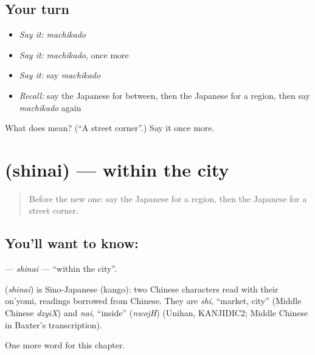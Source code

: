 \subsection*{Your turn}
\begin{itemize}
\raggedright
  \item \emph{Say it:} \emph{machikado}
  \item \emph{Say it:} \emph{machikado}, once more
  \item \emph{Say it:} say \emph{machikado}
  \item \emph{Recall:} say the Japanese for between, then the Japanese for a region, then say \emph{machikado} again
\end{itemize}

\begin{tcolorbox}[breakable,colback=teal!4,colframe=teal!35!black,title={Before you move on}]
What does  mean? (\textquotedblleft{}A street corner\textquotedblright{}.) Say it once more.
\end{tcolorbox}
\section[\texorpdfstring{\ja{しない} (shinai)}{しない (shinai)}]{ (shinai) — within the city}

\label{lesson:JA-C82-shinai}



\begin{quote}
Before the new one: say the Japanese for a region, then the Japanese for a street corner.
\end{quote}

\subsection*{You'll want to know: }
\textbf{} — \emph{shinai} — \textquotedblleft{}within the city\textquotedblright{}.

\begin{cousinweb}
\textbf{} (\emph{shinai}) is Sino-Japanese (kango): two Chinese characters read with their on'yomi, readings borrowed from Chinese. They are \emph{shi}, \textquotedblleft{}market, city\textquotedblright{} (Middle Chinese \emph{dzyiX}) and \emph{nai}, \textquotedblleft{}inside\textquotedblright{} (\emph{nwojH}) (Unihan, KANJIDIC2; Middle Chinese in Baxter's transcription).
\end{cousinweb}

\begin{grammarlens}[title={What you've built}]
One more word for this chapter.
\end{grammarlens}


